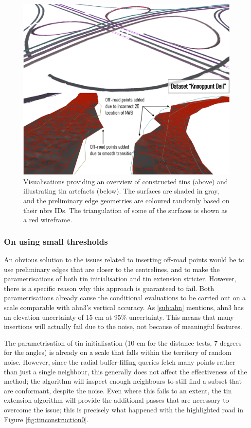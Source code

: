 \begin{figure}[h]
    \centering
    \includegraphics[width=0.9\linewidth]{final_report/figs/tinconstruction1.png}
    \caption[Overview render of constructed TINs and renders of TIN artefacts]{Visualisations providing an overview of constructed \ac{tin}s (above) and illustrating \ac{tin} artefacts (below). The surfaces are shaded in gray, and the preliminary edge geometries are coloured randomly based on their \ac{nbrs} IDs. The triangulation of some of the surfaces is shown as a red wireframe.}
    \label{fig:tinconstruction1}
\end{figure}

\subsubsection{On using small thresholds}

An obvious solution to the issues related to inserting off-road points would be to use preliminary edges that are closer to the centrelines, and to make the parametrisations of both \ac{tin} initialisation and \ac{tin} extension stricter. However, there is a specific reason why this approach is guaranteed to fail. Both parametrisations already cause the conditional evaluations to be carried out on a scale comparable with \ac{ahn3}'s vertical accuracy. As \ref{sub:ahn} mentions, \ac{ahn3} has an elevation uncertainty of 15 cm at 95\% uncertainty. This means that many insertions will actually fail due to the noise, not because of meaningful features.

The parametrisation of \ac{tin} initialisation (10 cm for the distance tests, 7 degrees for the angles) is already on a scale that falls within the territory of random noise. However, since the radial buffer-filling queries fetch many points rather than just a single neighbour, this generally does not affect the effectiveness of the method; the algorithm will inspect enough neighbours to still find a subset that are conformant, despite the noise. Even where this fails to an extent, the \ac{tin} extension algorithm will provide the additional passes that are necessary to overcome the issue; this is precisely what happened with the highlighted road in Figure \ref{fig:tinconstruction0}.


